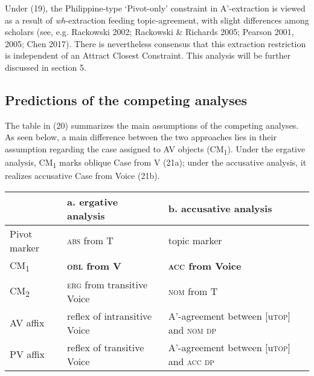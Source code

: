 \documentclass[10pt]{article}
\begin{document}
Under (19), the Philippine-type `Pivot-only' constraint in A'-extraction is viewed as a result of \textit{wh}-extraction feeding topic-agreement, with slight differences among scholars (see, e.g. Rackowski 2002; Rackowski \& Richards 2005; Pearson 2001, 2005; Chen 2017). There is nevertheless consensus that  this extraction restriction is independent of an Attract Closest Constraint. This analysis will be further discussed in section 5.

\subsection{Predictions of the competing analyses}

\noindent The table in (20) summarizes the main assumptions of the competing analyses. As seen below, a main difference between the two approaches lies in their assumption regarding the case assigned to AV objects (CM\textsubscript{1}). Under the ergative analysis, CM\textsubscript{1} marks oblique Case from V (21a); under the accusative analysis, it realizes accusative Case from Voice (21b). 

\begin{exe}
\vspace{-1mm}
\begin{table}[h]
\hspace{+1.2cm}\begin{tabular}{lll}
     & a. ergative analysis      & b. accusative analysis      \\\midrule
    Pivot marker   & \textsc{abs} from T  &
  topic marker\\
    CM\textsubscript{1}   &  \textbf{\textsc{obl} from V} &  \textbf{\textsc{acc} from Voice} \\
    CM\textsubscript{2} &  \textsc{erg} from transitive Voice &  \textsc{nom} from T \\\midrule
    AV affix & reflex of intransitive Voice & A'-agreement between [u\textsc{top}] and \textsc{nom dp}\\
    PV affix & reflex of transitive Voice & A'-agreement between [u\textsc{top}] and \textsc{acc dp}\\\midrule
\end{tabular}
\end{table}
\end{exe}
\end{document}
